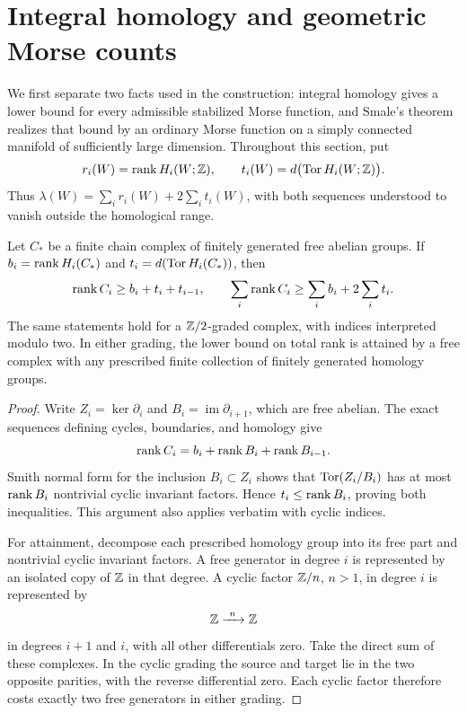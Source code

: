 \section{Integral homology and geometric Morse counts}
\label{sec:morse}

We first separate two facts used in the construction: integral homology
gives a lower bound for every admissible stabilized Morse function, and
Smale's theorem realizes that bound by an ordinary Morse function on a
simply connected manifold of sufficiently large dimension.  Throughout
this section, put
\[
 r_i(W)=\operatorname{rank} H_i(W;\mathbb Z),\qquad
 t_i(W)=d\bigl(\operatorname{Tor} H_i(W;\mathbb Z)\bigr).
\]
Thus $\lambda(W)=\sum_i r_i(W)+2\sum_i t_i(W)$, with both sequences
understood to vanish outside the homological range.

\begin{lemma}\label{morse:rank}
Let $C_*$ be a finite chain complex of finitely generated free abelian
groups.  If $b_i=\operatorname{rank} H_i(C_*)$ and
$t_i=d(\operatorname{Tor} H_i(C_*))$, then
\[
 \operatorname{rank} C_i\geq b_i+t_i+t_{i-1},\qquad
 \sum_i\operatorname{rank} C_i\geq\sum_i b_i+2\sum_i t_i.
\]
The same statements hold for a $\mathbb Z/2$-graded complex, with indices
interpreted modulo two.  In either grading, the lower bound on total
rank is attained by a free complex with any prescribed finite
collection of finitely generated homology groups.
\end{lemma}

\begin{proof}
Write $Z_i=\ker\partial_i$ and
$B_i=\operatorname{im}\partial_{i+1}$, which are free abelian.
The exact sequences defining cycles, boundaries, and homology give
\[
 \operatorname{rank} C_i=b_i+\operatorname{rank} B_i+\operatorname{rank} B_{i-1}.
\]
Smith normal form for the inclusion $B_i\subset Z_i$ shows that
$\operatorname{Tor}(Z_i/B_i)$ has at most $\operatorname{rank} B_i$ nontrivial cyclic invariant
factors.  Hence $t_i\leq\operatorname{rank} B_i$, proving both inequalities.
This argument also applies verbatim with cyclic indices.

For attainment, decompose each prescribed homology group into its free
part and nontrivial cyclic invariant factors.  A free generator in
degree $i$ is represented by an isolated copy of $\mathbb Z$ in that degree.
A cyclic factor $\mathbb Z/n$, $n>1$, in degree $i$ is represented by
\[
 \Z\xrightarrow{\ n\ }\Z
\]
in degrees $i+1$ and $i$, with all other differentials zero.
Take the direct sum of these complexes.  In the cyclic grading the
source and target lie in the two opposite parities, with the reverse
differential zero.  Each cyclic factor therefore costs exactly two
free generators in either grading.
\end{proof}

